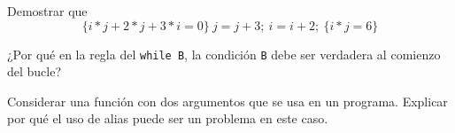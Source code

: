 \begin{ejercicio}
    Demostrar que
    \begin{equation*}
        \{i\ast j + 2 \ast j + 3\ast i = 0\}\ j=j+3;\ i=i+2;\ \{i\ast j=6\}
    \end{equation*}
\end{ejercicio}

\begin{ejercicio}
    ¿Por qué en la regla del \verb|while B|, la condición \verb|B| debe ser verdadera al comienzo del bucle?
\end{ejercicio}

\begin{ejercicio}
    Considerar una función con dos argumentos que se usa en un programa. Explicar por qué el uso de alias puede ser un problema en este caso.
\end{ejercicio}

